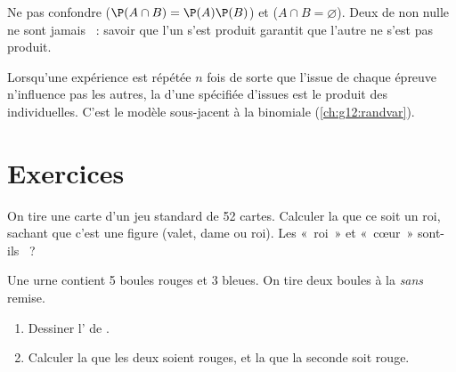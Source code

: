 \begin{remark}
Ne pas confondre \emph{} ($\P(A\cap B) = \P(A)\P(B)$) et
\emph{} ($A \cap B = \varnothing$). Deux 
 de  non nulle ne sont jamais ~: savoir
que l'un s'est produit garantit que l'autre ne s'est pas produit.
\end{remark}

\begin{definition}\label{def:g12:condprob:repet}
Lorsqu'une expérience est répétée $n$ fois de sorte que l'issue de chaque
épreuve n'influence pas les autres, la  d'une  spécifiée
d'issues est le produit des  individuelles. C'est le modèle
sous-jacent à la  binomiale (\cref{ch:g12:randvar}).
\end{definition}

\section{Exercices}

\begin{exercise}[$\star$]\label{exo:g12:condprob:1}
On tire une carte d'un jeu standard de 52 cartes. Calculer la 
que ce soit un roi, sachant que c'est une figure (valet, dame ou roi). Les
 «~roi~» et «~cœur~» sont-ils ~?
\end{exercise}

\begin{exercise}[$\star$]\label{exo:g12:condprob:2}
Une urne contient 5 boules rouges et 3 bleues. On tire deux boules à la
 \emph{sans} remise.
\begin{enumerate}
  \item Dessiner l' de .
  \item Calculer la  que les deux soient rouges, et la
         que la seconde soit rouge.
\end{enumerate}
\end{exercise}

